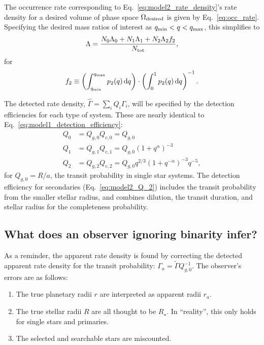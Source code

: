 The occurrence rate corresponding to Eq.~\ref{eq:model2_rate_density}'s rate 
density for a desired volume of phase space $\Omega_{\rm desired}$ is given by 
Eq.~\ref{eq:occ_rate}.
Specifying the desired mass ratios of interest as $q_{\rm min} < q < q_{\rm 
max}$, this simplifies to
\begin{equation}
\Lambda = 
\frac{N_0 \Lambda_0 + N_1 \Lambda_1 + N_2 \Lambda_2 f_2}
{N_{\rm tot}},
\end{equation}
for
\begin{equation}
f_2 \equiv
\left(
\int_{q_{\rm min}}^{q_{\rm max}} p_2(q) \,{\rm d}q
\right)
\cdot
\left(
\int_{0}^{1} p_2(q) \,{\rm d}q
\right)^{-1}.
\end{equation}

The detected rate density, $\hat{\Gamma} = \sum_i Q_i \Gamma_i$, will be 
specified by the detection efficiencies for each type of system.
These are nearly identical to Eq.~\ref{eq:model1_detection_efficiency}:
\begin{align}
Q_0 &= Q_{g,0}Q_{c,0} = Q_{g,0} \label{eq:model2_Q_0}\\
Q_1 &= Q_{g,1}Q_{c,1} = Q_{g,0} (1+q^\alpha)^{-3} \\
Q_2 &= Q_{g,2}Q_{c,2} = Q_{g,0} q^{2/3} (1+q^{-\alpha})^{-3} q^{-5}, 
\label{eq:model2_Q_2}
\end{align}
for $Q_{g,0}=R/a$, the transit probability in single star systems.
The detection efficiency for secondaries (Eq.~\ref{eq:model2_Q_2}) includes 
the transit probability from the smaller stellar radius, and combines 
dilution, the transit duration, and stellar radius for the completeness
probability.

\subsection{What does an observer ignoring binarity infer?}

As a reminder, the apparent rate density is found by correcting the detected 
apparent rate density for the transit probability:
$\Gamma_a = \tilde{\Gamma} Q_{g,0}^{-1}$.
The observer's errors are as follows:
\begin{enumerate}
    \item The true planetary radii $r$ are interpreted as apparent radii $r_a$.
    \item The true stellar radii $R$ are all thought to be $R_\star$. In 
    ``reality'', this only holds for single stars and primaries.
    \item The selected and searchable stars are miscounted.
\end{enumerate}

